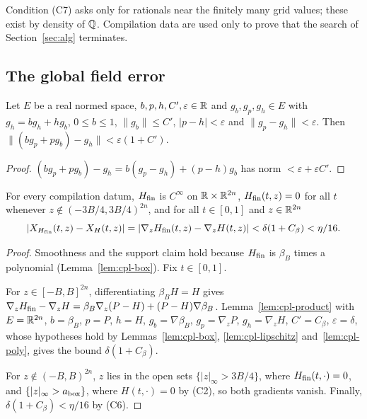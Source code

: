 \begin{remark}\label{rem:cpl-values}
Condition (C7) asks only for rationals near the finitely many grid values; these exist by density of $\mathbb{Q}$.
Compilation data are used only to prove that the search of Section~\ref{sec:alg} terminates.
\end{remark}

\subsection{The global field error}\label{sec:cpl-cutoff}

\begin{lemma}\label{lem:cpl-product}
Let $E$ be a real normed space, $b,p,h,C',\varepsilon\in\mathbb{R}$ and $g_b,g_p,g_h\in E$ with $g_h=bg_h+hg_b$,
$0\le b\le1$, $\|g_b\|\le C'$, $|p-h|<\varepsilon$ and $\|g_p-g_h\|<\varepsilon$. Then
$\|(bg_p+pg_b)-g_h\|<\varepsilon(1+C')$.
\end{lemma}

\begin{proof}
$(bg_p+pg_b)-g_h=b(g_p-g_h)+(p-h)g_b$ has norm $<\varepsilon+\varepsilon C'$.
\end{proof}

\begin{lemma}\label{lem:cpl-cutoff}
For every compilation datum, $H_{\mathrm{fin}}$ is $C^\infty$ on $\mathbb{R}\times\mathbb{R}^{2n}$, $H_{\mathrm{fin}}(t,z)=0$ for all $t$ whenever
$z\notin(-3B/4,3B/4)^{2n}$, and for all $t\in[0,1]$ and $z\in\mathbb{R}^{2n}$
\[
 |X_{H_{\mathrm{fin}}}(t,z)-X_H(t,z)|=|\nabla_zH_{\mathrm{fin}}(t,z)-\nabla_zH(t,z)|<\delta(1+C_\beta)<\eta/16 .
\]
\end{lemma}

\begin{proof}
Smoothness and the support claim hold because $H_{\mathrm{fin}}$ is $\beta_B$ times a polynomial (Lemma~\ref{lem:cpl-box}). Fix $t\in[0,1]$.

For $z\in[-B,B]^{2n}$, differentiating $\beta_BH=H$ gives $\nabla_zH_{\mathrm{fin}}-\nabla_zH=\beta_B\nabla_z(P-H)+(P-H)\nabla\beta_B$. Lemma~\ref{lem:cpl-product} with $E=\mathbb{R}^{2n}$, $b=\beta_B$, $p=P$, $h=H$, $g_b=\nabla\beta_B$, $g_p=\nabla_zP$, $g_h=\nabla_zH$, $C'=C_\beta$, $\varepsilon=\delta$, whose hypotheses hold by Lemmas~\ref{lem:cpl-box}, \ref{lem:cpl-lipschitz} and~\ref{lem:cpl-poly}, gives the bound $\delta(1+C_\beta)$.

For $z\notin(-B,B)^{2n}$, $z$ lies in the open sets $\{|z|_\infty>3B/4\}$, where $H_{\mathrm{fin}}(t,\cdot)=0$, and $\{|z|_\infty>a_{\rm box}\}$, where $H(t,\cdot)=0$ by (C2), so both gradients vanish. Finally, $\delta(1+C_\beta)<\eta/16$ by (C6).
\end{proof}

